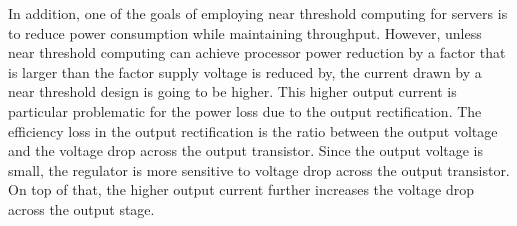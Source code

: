 In addition,  one of the goals of employing near threshold computing for servers
is to reduce power consumption while maintaining throughput. However, unless
near threshold computing can achieve processor power reduction by a factor that
is larger than the factor supply voltage is reduced by, the current drawn by a
near threshold design is going to be higher. This higher output current is
particular problematic for the power loss due to the output rectification. The
efficiency loss in the output rectification is the ratio between the output
voltage and the voltage drop across the output transistor. Since the output
voltage is small, the regulator is more sensitive to voltage drop across the
output transistor. On top of that, the higher output current further increases
the voltage drop across the output stage.  

